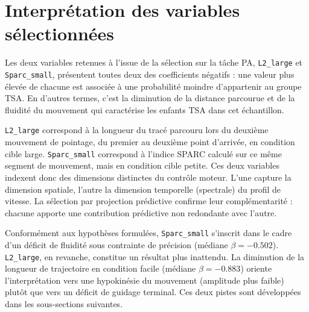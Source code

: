 \section{Interprétation des variables sélectionnées}
Les deux variables retenues à l'issue de la sélection sur la tâche PA, \texttt{L2\_large} et \texttt{Sparc\_small}, présentent toutes deux des coefficients négatifs : une valeur plus élevée de chacune est associée à une probabilité moindre d'appartenir au groupe TSA. En d'autres termes, c'est la diminution de la distance parcourue et de la fluidité du mouvement qui caractérise les enfants TSA dans cet échantillon.

\medskip

\texttt{L2\_large} correspond à la longueur du tracé parcouru lors du deuxième mouvement de pointage, du premier au deuxième point d'arrivée, en condition cible large. \texttt{Sparc\_small} correspond à l'indice SPARC calculé sur ce même segment de mouvement, mais en condition cible petite. Ces deux variables indexent donc des dimensions distinctes du contrôle moteur. L'une capture la dimension spatiale, l'autre la dimension temporelle (spectrale) du profil de vitesse. La sélection par projection prédictive confirme leur complémentarité : chacune apporte une contribution prédictive non redondante avec l'autre.

\medskip

Conformément aux hypothèses formulées, \texttt{Sparc\_small} s'inscrit dans le cadre d'un déficit de fluidité sous contrainte de précision (médiane $\beta = -0.502$). \texttt{L2\_large}, en revanche, constitue un résultat plus inattendu. La diminution de la longueur de trajectoire en condition facile (médiane $\beta = -0.883$) oriente l'interprétation vers une hypokinésie du mouvement (amplitude plus faible) plutôt que vers un déficit de guidage terminal. Ces deux pistes sont développées dans les sous-sections suivantes.

%
%



